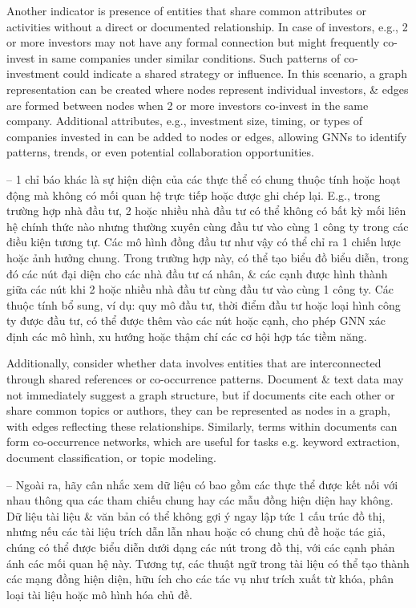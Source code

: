 \documentclass{article}
\begin{document}
\begin{itemize}
\begin{itemize}
\begin{itemize}
            Another indicator is presence of entities that share common attributes or activities without a direct or documented relationship. In case of investors, e.g., 2 or more investors may not have any formal connection but might frequently co-invest in same companies under similar conditions. Such patterns of co-investment could indicate a shared strategy or influence. In this scenario, a graph representation can be created where nodes represent individual investors, \& edges are formed between nodes when 2 or more investors co-invest in the same company. Additional attributes, e.g., investment size, timing, or types of companies invested in can be added to nodes or edges, allowing GNNs to identify patterns, trends, or even potential collaboration opportunities.

            -- 1 chỉ báo khác là sự hiện diện của các thực thể có chung thuộc tính hoặc hoạt động mà không có mối quan hệ trực tiếp hoặc được ghi chép lại. E.g., trong trường hợp nhà đầu tư, 2 hoặc nhiều nhà đầu tư có thể không có bất kỳ mối liên hệ chính thức nào nhưng thường xuyên cùng đầu tư vào cùng 1 công ty trong các điều kiện tương tự. Các mô hình đồng đầu tư như vậy có thể chỉ ra 1 chiến lược hoặc ảnh hưởng chung. Trong trường hợp này, có thể tạo biểu đồ biểu diễn, trong đó các nút đại diện cho các nhà đầu tư cá nhân, \& các cạnh được hình thành giữa các nút khi 2 hoặc nhiều nhà đầu tư cùng đầu tư vào cùng 1 công ty. Các thuộc tính bổ sung, ví dụ: quy mô đầu tư, thời điểm đầu tư hoặc loại hình công ty được đầu tư, có thể được thêm vào các nút hoặc cạnh, cho phép GNN xác định các mô hình, xu hướng hoặc thậm chí các cơ hội hợp tác tiềm năng.

            Additionally, consider whether data involves entities that are interconnected through shared references or co-occurrence patterns. Document \& text data may not immediately suggest a graph structure, but if documents cite each other or share common topics or authors, they can be represented as nodes in a graph, with edges reflecting these relationships. Similarly, terms within documents can form co-occurrence networks, which are useful for tasks e.g. keyword extraction, document classification, or topic modeling.

            -- Ngoài ra, hãy cân nhắc xem dữ liệu có bao gồm các thực thể được kết nối với nhau thông qua các tham chiếu chung hay các mẫu đồng hiện diện hay không. Dữ liệu tài liệu \& văn bản có thể không gợi ý ngay lập tức 1 cấu trúc đồ thị, nhưng nếu các tài liệu trích dẫn lẫn nhau hoặc có chung chủ đề hoặc tác giả, chúng có thể được biểu diễn dưới dạng các nút trong đồ thị, với các cạnh phản ánh các mối quan hệ này. Tương tự, các thuật ngữ trong tài liệu có thể tạo thành các mạng đồng hiện diện, hữu ích cho các tác vụ như trích xuất từ khóa, phân loại tài liệu hoặc mô hình hóa chủ đề.


\end{itemize}
\end{itemize}
\end{itemize}
\end{document}
